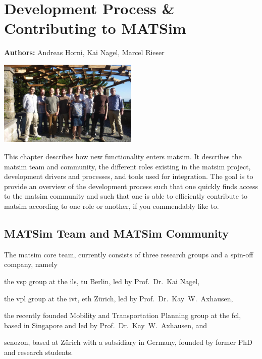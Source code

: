 \chapter{Development Process \& Contributing to MATSim}
\label{ch:developmentprocess}

\hfill \textbf{Authors:} Andreas Horni, Kai Nagel, Marcel Rieser

\begin{center} \includegraphics[width=0.5\textwidth, angle=0]{extending/figures/ConceptualMeetingVillaHatt.png} \end{center}

This chapter describes how new functionality enters \gls{matsim}. It describes the \gls{matsim} team and community, the different roles existing in the \gls{matsim} project, development drivers and processes, and tools used for integration. The goal is to 
provide an overview of the development process such that 
one quickly finds access to the \gls{matsim} community and such that 
one is able to efficiently contribute to \gls{matsim} according to one role or another, if you commendably like to.

\section{MATSim Team and MATSim Community}
The \gls{matsim} core team, 
currently consists of three research groups and a spin-off company, namely 
\begin{compactitem}
\item the \gls{vsp} group at the \gls{ils}, \gls{tu} Berlin, led by Prof.~Dr.~Kai Nagel,
\item the \gls{vpl} group at the \gls{ivt}, \gls{eth} Zürich, led by Prof.~Dr.~Kay~W.~Axhausen, 
\item the recently founded Mobility and Transportation Planning group at the \gls{fcl}, based in Singapore and led by Prof.~Dr.~Kay~W.~Axhausen, and 
\item \gls{senozon}, based at Zürich with a subsidiary in Germany, founded by former PhD and research students. 
\end{compactitem}

